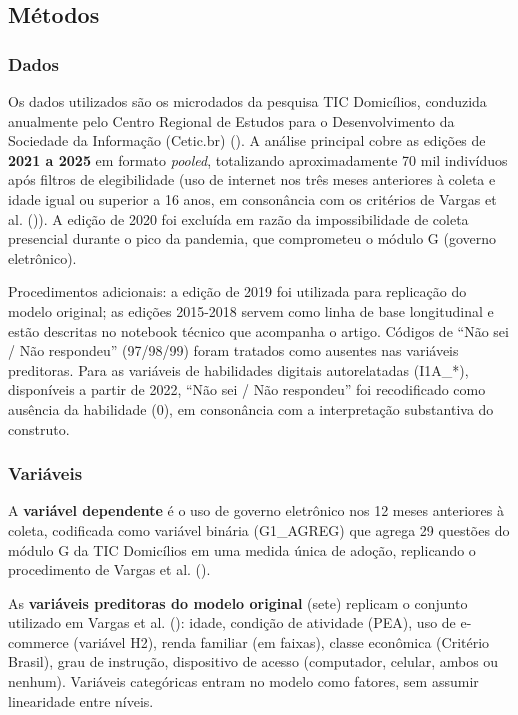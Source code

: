 \documentclass[
  man,
  floatsintext,
  longtable,
  a4paper,
  nolmodern,
  notxfonts,
  notimes,
  colorlinks=true,linkcolor=blue,citecolor=blue,urlcolor=blue]{apa7}
\begin{document}
\subsection{Métodos}\label{muxe9todos}

\subsubsection{Dados}\label{dados}

Os dados utilizados são os microdados da pesquisa TIC Domicílios,
conduzida anualmente pelo Centro Regional de Estudos para o
Desenvolvimento da Sociedade da Informação (Cetic.br)
(). A análise principal cobre as
edições de \textbf{2021 a 2025} em formato \emph{pooled}, totalizando
aproximadamente 70 mil indivíduos após filtros de elegibilidade (uso de
internet nos três meses anteriores à coleta e idade igual ou superior a
16 anos, em consonância com os critérios de Vargas et al.
()). A edição de 2020 foi excluída em
razão da impossibilidade de coleta presencial durante o pico da
pandemia, que comprometeu o módulo G (governo eletrônico).

Procedimentos adicionais: a edição de 2019 foi utilizada para replicação
do modelo original; as edições 2015-2018 servem como linha de base
longitudinal e estão descritas no notebook técnico que acompanha o
artigo. Códigos de ``Não sei / Não respondeu'' (97/98/99) foram tratados
como ausentes nas variáveis preditoras. Para as variáveis de habilidades
digitais autorelatadas (I1A\_*), disponíveis a partir de 2022, ``Não sei
/ Não respondeu'' foi recodificado como ausência da habilidade (0), em
consonância com a interpretação substantiva do construto.

\subsubsection{Variáveis}\label{variuxe1veis}

A \textbf{variável dependente} é o uso de governo eletrônico nos 12
meses anteriores à coleta, codificada como variável binária (G1\_AGREG)
que agrega 29 questões do módulo G da TIC Domicílios em uma medida única
de adoção, replicando o procedimento de Vargas et al.
().

As \textbf{variáveis preditoras do modelo original} (sete) replicam o
conjunto utilizado em Vargas et al. ():
idade, condição de atividade (PEA), uso de e-commerce (variável H2),
renda familiar (em faixas), classe econômica (Critério Brasil), grau de
instrução, dispositivo de acesso (computador, celular, ambos ou nenhum).
Variáveis categóricas entram no modelo como fatores, sem assumir
linearidade entre níveis.
\end{document}
